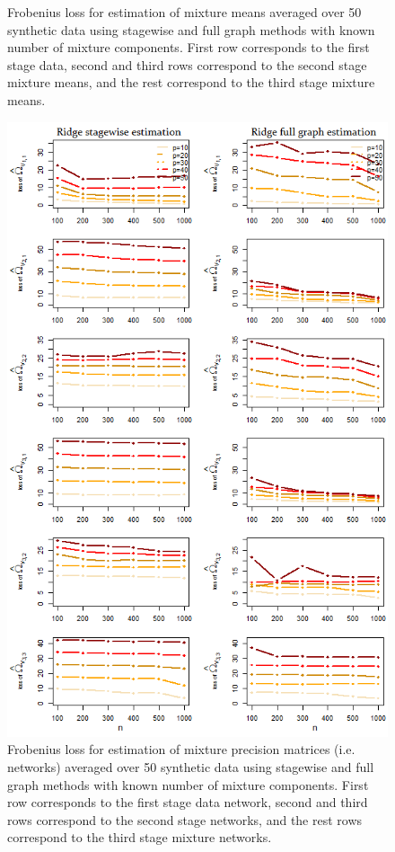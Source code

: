 \documentclass[10pt]{article}
\begin{document}
\begin{figure}
\begin{center}
\end{center}
\caption{Frobenius loss for estimation of mixture means averaged over 50 synthetic data using stagewise and full graph methods with known number of mixture components. First row corresponds to the first stage data, second and third rows correspond to the second stage mixture means, and the rest correspond to the third stage mixture means.}
\label{fig:mu_err}
\end{figure}

\begin{figure}
\begin{center}
 \includegraphics[scale=.6]{thet_err.png}
\end{center}
\caption{Frobenius loss for estimation of mixture precision matrices (i.e. networks) averaged over 50 synthetic data using stagewise and full graph methods with known number of mixture components. First row corresponds to the first stage data network, second and third rows correspond to the second stage networks, and the rest rows correspond to the third stage mixture networks.}
\label{fig:thet_err}
\end{figure}
\end{document}
